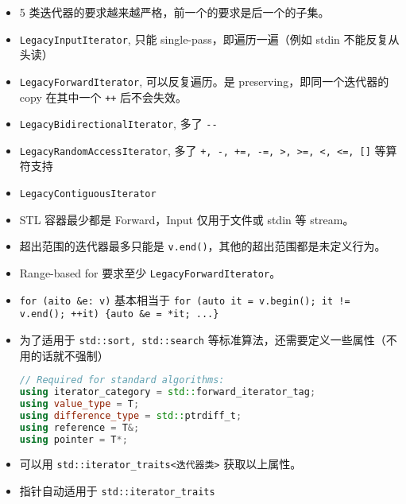 
\begin{itemize}
\item 5 类迭代器的要求越来越严格，前一个的要求是后一个的子集。
\item \verb`LegacyInputIterator`, 只能 single-pass，即遍历一遍（例如 stdin 不能反复从头读）
\item \verb`LegacyForwardIterator`, 可以反复遍历。是 preserving，即同一个迭代器的 copy 在其中一个 \verb`++` 后不会失效。
\item \verb`LegacyBidirectionalIterator`, 多了 \verb`--`
\item \verb`LegacyRandomAccessIterator`, 多了 \verb`+, -, +=, -=, >, >=, <, <=, []` 等算符支持
\item \verb`LegacyContiguousIterator`
\item STL 容器最少都是 Forward，Input 仅用于文件或 stdin 等 stream。
\item 超出范围的迭代器最多只能是 \verb`v.end()`，其他的超出范围都是未定义行为。
\item Range-based for 要求至少 \verb`LegacyForwardIterator`。
\item \verb`for (aito &e: v)` 基本相当于 \verb`for (auto it = v.begin(); it != v.end(); ++it) {auto &e = *it; ...}`
\item 为了适用于 \verb`std::sort, std::search` 等标准算法，还需要定义一些属性（不用的话就不强制）
\begin{lstlisting}[language=cpp]
// Required for standard algorithms:
using iterator_category = std::forward_iterator_tag;
using value_type = T;
using difference_type = std::ptrdiff_t;
using reference = T&;
using pointer = T*;
\end{lstlisting}
\item 可以用 \verb`std::iterator_traits<迭代器类>` 获取以上属性。
\item 指针自动适用于 \verb`std::iterator_traits`
\end{itemize}
